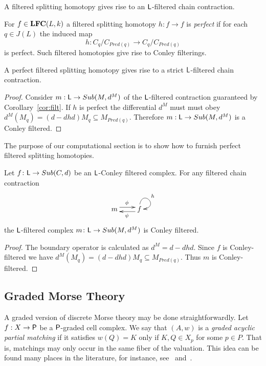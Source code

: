 \begin{cor}\label{cor:filt}
A filtered splitting homotopy gives rise to an ${\mathsf L}$-filtered chain contraction.
\end{cor}

For $f\in {\bf LFC}(L,k)$ a filtered splitting homotopy $h:f\to f$ is {\em perfect} if for each $q\in J(L)$ the induced map $$h:C_q/C_{Pred(q)}\to C_q/C_{Pred(q)}$$ is perfect.  Such filtered homotopies give rise to Conley filterings.

\begin{cor}
A perfect filtered splitting homotopy gives rise to a strict ${\mathsf L}$-filtered chain contraction.
\end{cor}
\begin{proof}
 Consider $m:{\mathsf L}\to Sub(M,d^M)$ of the ${\mathsf L}$-filtered contraction guaranteed by Corollary~\ref{cor:filt}.  If $h$ is perfect the differential $d^M$ must must obey $d^M(M_q) = (d-dhd)M_q\subseteq M_{Pred(q)}$.  Therefore $m:{\mathsf L}\to Sub(M,d^M)$ is a Conley filtered.
\end{proof}

The purpose of our computational section is to show how to furnish perfect filtered splitting homotopies.  


\begin{prop}
Let $f\colon{\mathsf L}\to Sub(C,d)$ be an ${\mathsf L}$-Conley filtered complex.  For any filtered chain contraction
\[
\xymatrixrowsep{0.03in}
\xymatrixcolsep{0.3in}
\xymatrix{
m  \ar[r]<3pt>^{\phi} & \ar[l]<3pt>^{\psi} f \ar@(u,r)^{h}
}
\]
the ${\mathsf L}$-filtered complex $m\colon {\mathsf L}\to Sub(M,d^M)$ is Conley filtered.  
\end{prop}
\begin{proof}
 The boundary operator is calculated as $d^M= d-dhd$.  Since $f$ is Conley-filtered  we have $d^M(M_q) = (d-dhd)M_q\subseteq M_{Pred(q)}$.  Thus $m$ is Conley-filtered.
\end{proof}




\subsection{Graded Morse Theory}

A graded version of discrete Morse theory may be done straightforwardly.   Let $f:X\to {\mathsf P}$ be a ${\mathsf P}$-graded cell complex.  We say that $(A,w)$ is a {\em graded acyclic partial matching} if it satisfies $w(Q)=K$ only if $K,Q\in X_p$ for some $p\in P$.  That is, matchings may only occur in the same fiber of the valuation.  This idea can be found many places in the literature, for instance, see~\cite{mn} and~\cite[Patchwork Theorem]{koz}.

